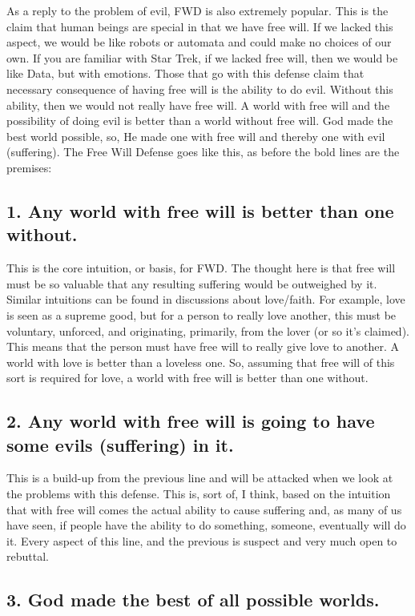 As a reply to the problem of evil, FWD is also extremely popular. This is the claim that human beings are special in that we have free will. If we lacked this aspect, we would be like robots or automata and could make no choices of our own. If you are familiar with Star Trek, if we lacked free will, then we would be like Data, but with emotions. Those that go with this defense claim that  necessary consequence of having free will is the ability to do evil. Without this ability, then we would not really have free will.  A world with free will and the possibility of doing evil is better than a world without free will. God made the best world possible, so, He made one with free will and thereby one with evil (suffering). The Free Will Defense goes like this, as before the bold lines are the premises:

\subsection{1. Any world with free will is better than one without.}

This is the core intuition, or basis, for FWD. The thought here is that free will must be so valuable that any resulting suffering would be outweighed by it. Similar intuitions can be found in discussions about love/faith. For example, love is seen as a supreme good, but for a person to really love another, this must be voluntary, unforced, and originating, primarily, from the lover (or so it's claimed). This means that the person must have free will to really give love to another. A world with love is better than a loveless one. So, assuming that free will of this sort is required for love, a world with free will is better than one without.  

\subsection{2. Any world with free will is going to have some evils (suffering) in it.}

This is a build-up from the previous line and will be attacked when we look at the problems with this defense. This is, sort of, I think, based on the intuition that with free will comes the actual ability to cause suffering and, as many of us have seen, if people have the ability to do something, someone, eventually will do it. Every aspect of this line, and the previous is suspect and very much open to rebuttal. 

\subsection{3. God made the best of all possible worlds.}

